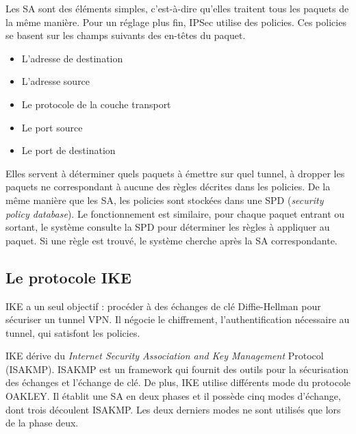 Les SA sont des éléments simples, c'est-à-dire qu'elles traitent tous les paquets de la même manière. 
Pour un réglage plus fin, IPSec utilise des policies. 
Ces policies se basent sur les champs suivants des en-têtes du paquet.
\begin{itemize}
\item L'adresse de destination
\item L'adresse source
\item Le protocole de la couche transport
\item Le port source
\item Le port de destination
\end{itemize}
Elles servent à déterminer quels paquets à émettre sur quel tunnel, à dropper les paquets ne correspondant à aucune des règles décrites dans les policies. 
De la même manière que les SA, les policies sont stockées dans une SPD (\textit{security policy database}). 
Le fonctionnement est similaire, pour chaque paquet entrant ou sortant, le système consulte la SPD pour déterminer les règles à appliquer au paquet. Si une règle est trouvé, le système cherche après la SA correspondante.

\subsection{Le protocole IKE}
IKE a un seul objectif : procéder à des échanges de clé Diffie-Hellman pour sécuriser un tunnel VPN. 
Il négocie le chiffrement, l'authentification nécessaire au tunnel, qui satisfont les policies. 

IKE dérive du \textit{Internet Security Association and Key Management} Protocol (ISAKMP). 
ISAKMP est un framework qui fournit des outils pour la sécurisation des échanges et l'échange de clé. 
De plus, IKE utilise différents mode du protocole OAKLEY.
Il établit une SA en deux phases et il possède cinq modes d'échange, dont trois découlent ISAKMP.
Les deux derniers modes ne sont utilisés que lors de la phase deux.

